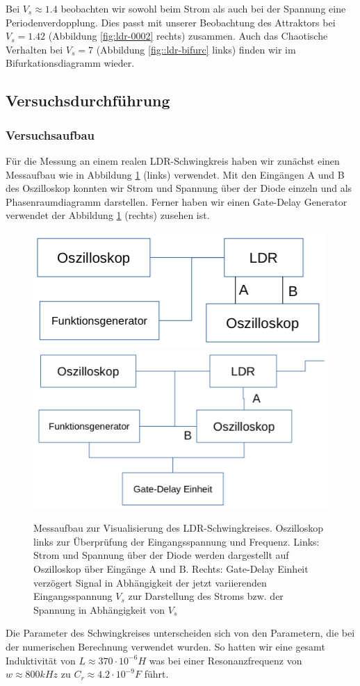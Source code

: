 \documentclass[12pt,a4paper]{article}
\begin{document}
Bei $V_s\approx1.4$ beobachten wir sowohl beim Strom als auch bei der Spannung eine Periodenverdopplung. Dies passt mit unserer Beobachtung des Attraktors bei $V_s=1.42$ (Abbildung \ref{fig:ldr-0002} rechts) zusammen. Auch das Chaotische Verhalten bei $V_s=7$ (Abbildung \ref{fig::ldr-bifurc} links) finden wir im Bifurkationsdiagramm wieder.


\subsection { Versuchsdurchführung }
\subsubsection{ Versuchsaufbau}
Für die Messung an einem realen LDR-Schwingkreis haben wir zunächst einen Messaufbau wie in Abbildung \ref{fig:ldr-aufbau1} (links) verwendet. Mit den Eingängen A und B des Oszilloskop konnten wir Strom und Spannung über der Diode einzeln und als Phasenraumdiagramm darstellen. Ferner haben wir einen Gate-Delay Generator verwendet der Abbildung \ref{fig:ldr-aufbau1} (rechts) zusehen ist.
\begin{figure}[!htbp]
\includegraphics[scale=0.4]{aufbau1}
\includegraphics[scale=0.38]{aufbau2}
\caption{Messaufbau zur Visualisierung des LDR-Schwingkreises. Oszilloskop links zur Überprüfung der Eingangsspannung und Frequenz. Links: Strom und Spannung über der Diode werden dargestellt auf Oszilloskop über Eingänge A und B. Rechts: Gate-Delay Einheit verzögert Signal in Abhängigkeit der jetzt variierenden Eingangsspannung $V_s$ zur Darstellung des Stroms bzw. der Spannung in Abhängigkeit von $V_s$ }
\label{fig:ldr-aufbau1}
\end{figure}
Die Parameter des Schwingkreises unterscheiden sich von den Parametern, die bei der numerischen Berechnung verwendet wurden. So hatten wir eine gesamt Induktivität von $L\approx370\cdot10^{-6}H$ was bei einer Resonanzfrequenz von $w\approx800kHz$ zu $C_r\approx4.2\cdot10^{-9}F$ führt.
\end{document}
